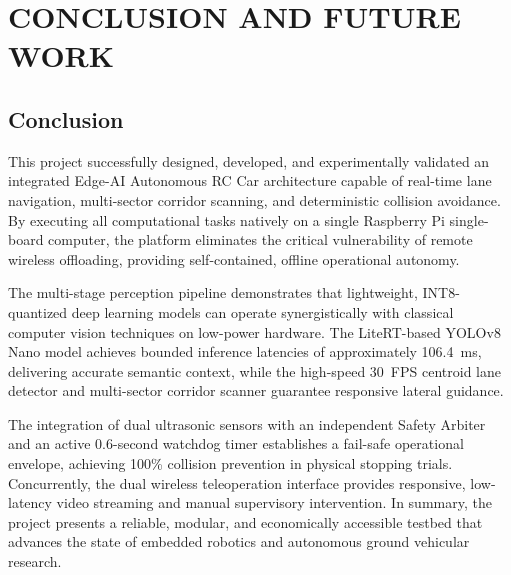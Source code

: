 \chapter{CONCLUSION AND FUTURE WORK}

\section{Conclusion}
This project successfully designed, developed, and experimentally validated an integrated Edge-AI Autonomous RC Car architecture capable of real-time lane navigation, multi-sector corridor scanning, and deterministic collision avoidance. By executing all computational tasks natively on a single Raspberry Pi single-board computer, the platform eliminates the critical vulnerability of remote wireless offloading, providing self-contained, offline operational autonomy.

The multi-stage perception pipeline demonstrates that lightweight, INT8-quantized deep learning models can operate synergistically with classical computer vision techniques on low-power hardware. The LiteRT-based YOLOv8 Nano model achieves bounded inference latencies of approximately 106.4~ms, delivering accurate semantic context, while the high-speed 30~FPS centroid lane detector and multi-sector corridor scanner guarantee responsive lateral guidance. 

The integration of dual ultrasonic sensors with an independent Safety Arbiter and an active 0.6-second watchdog timer establishes a fail-safe operational envelope, achieving 100\% collision prevention in physical stopping trials. Concurrently, the dual wireless teleoperation interface provides responsive, low-latency video streaming and manual supervisory intervention. In summary, the project presents a reliable, modular, and economically accessible testbed that advances the state of embedded robotics and autonomous ground vehicular research.

